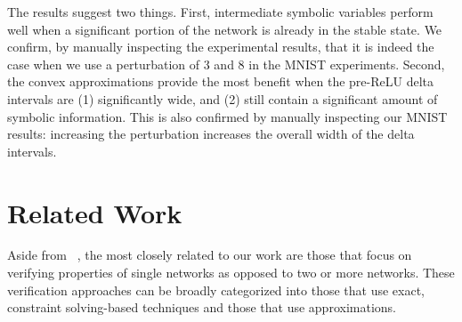The results suggest two things.
%
First, intermediate
symbolic variables perform well when a significant portion of the
network is already in the stable state.  We confirm, by manually
inspecting the experimental results, that it is indeed the case when
we use a perturbation of 3 and 8 in the MNIST experiments.
Second, the convex approximations provide the most benefit when the
pre-ReLU delta intervals are (1) significantly wide, and (2) still
contain a significant amount of symbolic information. This is also
confirmed by manually inspecting our MNIST results: increasing the
perturbation increases the overall width of the delta intervals.

%


\section{Related Work}
\label{neurodiff:sec:related}


Aside from \ReluDiff{}~\cite{PaulsenWW20}, the most closely related to
our work are those that focus on verifying properties of single
networks as opposed to two or more networks. These verification
approaches can be broadly categorized into those that use exact,
constraint solving-based techniques and those that use approximations.


